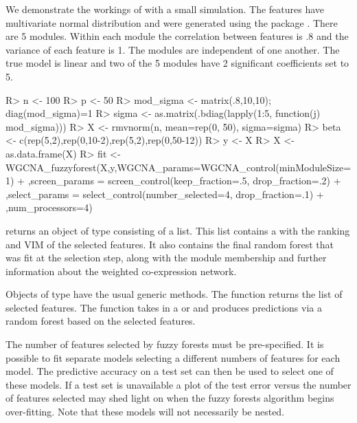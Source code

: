 \documentclass[article,shortnames]{jss}
\begin{document}
We demonstrate the workings of  with a small simulation.
The features have multivariate normal distribution and were generated using the package .  
There are 5 modules.  Within each module the correlation between features
is .8 and the variance of each feature is 1.  The modules are independent of one another.
The true model is linear and two of the 5 modules have 2 significant coefficients set to 5.
\begin{CodeChunk}
\begin{CodeInput}
R> n <- 100
R> p <- 50
R> mod_sigma <- matrix(.8,10,10); diag(mod_sigma)=1
R> sigma <- as.matrix(.bdiag(lapply(1:5, function(j) mod_sigma))) 
R> X <- rmvnorm(n, mean=rep(0, 50), sigma=sigma)
R> beta <- c(rep(5,2),rep(0,10-2),rep(5,2),rep(0,50-12))
R> y <- X%
R> X <- as.data.frame(X)
R> fit <- WGCNA_fuzzyforest(X,y,WGCNA_params=WGCNA_control(minModuleSize=1)
+ ,screen_params = screen_control(keep_fraction=.5, drop_fraction=.2)
+ ,select_params = select_control(number_selected=4, drop_fraction=.1) 
+ ,num_processors=4)
\end{CodeInput}
\end{CodeChunk}
 returns an  object of type  consisting of a list.  This list 
contains a  with the ranking and VIM of the selected features.  It also contains the final random
forest that was fit at the selection step, along with the module membership and further information about
the weighted co-expression network.

Objects of type  have the usual generic methods.  The function  returns the list
of selected features.  The function  takes in a  or 
 and produces predictions via a random forest based on the selected features.  

The number of features selected by fuzzy forests must be pre-specified.  It is possible to fit separate models
selecting a different numbers of features for each model.  The predictive accuracy on a test set can then 
be used to select one of these models.  If a test set is unavailable a plot of the test error versus the number 
of features selected may shed light on when the fuzzy forests algorithm begins over-fitting.
Note that these models will not necessarily be nested.
  
\end{document}
